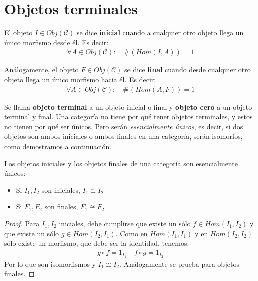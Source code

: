 \documentclass[11pt, fleqn, spanish]{book}
\newcommand{\C}{\mathcal{C} }
\begin{document}
  \section {Objetos terminales}
    \begin{definition}
      El objeto $I \in Obj(\C)$ se dice \textbf{inicial} cuando a cualquier otro objeto llega
      un único morfismo desde él. Es decir:
      \begin{gather*}
	\forall A \in Obj(\C):\quad \#(Hom(I,A)) = 1
      \end{gather*}
    \end{definition}
 

    \begin{definition}
      Análogamente, el objeto $F \in Obj(\C)$ se dice \textbf{final} cuando desde cualquier otro objeto llega
      un único morfismo hacia él. Es decir:
      \begin{gather*}
	\forall A \in Obj(\C):\quad \#(Hom(A,F)) = 1
      \end{gather*}
    \end{definition}
 
    
    Se llama \textbf{objeto terminal} a un objeto inicial o final y \textbf{objeto cero} a un objeto
    terminal y final. Una categoría no tiene por qué
    tener objetos terminales, y estos no tienen por qué ser únicos. Pero serán \textit{esencialmente únicos},
    es decir, si dos objetos son ambos iniciales o ambos finales en una categoría, serán isomorfos,
    como demostramos a continuación.
    
    \begin{theorem} Los objetos iniciales y los objetos finales de una
    categoría son esencialmente únicos:
      \begin{itemize}
	\item Si $I_1,I_2$ son iniciales, $I_1 \cong I_2$
	\item Si $F_1,F_2$ son finales, $F_1 \cong F_2$
      \end{itemize}
    \end{theorem}

    \begin{proof}
      Para $I_1,I_2$ iniciales, debe cumplirse que existe un sólo $f \in Hom(I_1,I_2)$
      y que existe un sólo $g \in Hom(I_2,I_1)$. Como en $Hom(I_1,I_1)$ y en $Hom(I_2,I_2)$ sólo existe un morfismo,
      que debe ser la identidad, tenemos:
      \begin{gather*}
	g \circ f = 1_{I_1} \quad f \circ g = 1_{I_2}
      \end{gather*}
      Por lo que son isomorfismos y $I_1 \cong I_2$. Análogamente se prueba para objetos finales.
    \end{proof}
    
\end{document}
